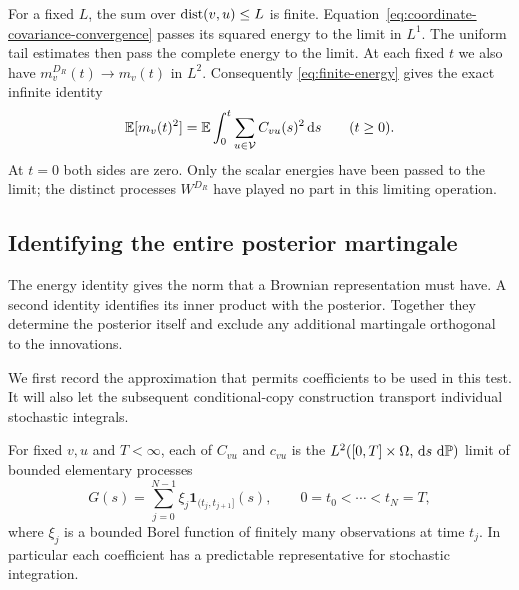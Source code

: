 For a fixed $L$, the sum over $\operatorname{dist}(v,u)\le L$ is finite.
Equation~\eqref{eq:coordinate-covariance-convergence} passes its
squared energy to the limit in $L^1$.  The uniform tail estimates
then pass the complete energy to the limit.  At each fixed $t$ we
also have $m_v^{D_R}(t)\to m_v(t)$ in $L^2$.  Consequently
\eqref{eq:finite-energy} gives the exact infinite identity
\begin{equation}
 \label{eq:covariance-energy}
 \mathbb E[m_v(t)^2]
    =\mathbb E\int_0^t\sum_{u\in\mathcal V}C_{vu}(s)^2\,\mathrm d s
        \qquad(t\ge0).
\end{equation}
At $t=0$ both sides are zero.  Only the scalar energies have been
passed to the limit; the distinct processes $W^{D_R}$ have played
no part in this limiting operation.

\subsection{Identifying the entire posterior martingale}

The energy identity gives the norm that a Brownian representation must
have.  A second identity identifies its inner product with the
posterior.  Together they determine the posterior itself and exclude
any additional martingale orthogonal to the innovations.

We first record the approximation that permits coefficients to be
used in this test.  It will also let the subsequent conditional-copy
construction transport individual stochastic integrals.

\begin{lemma}
 \label{lem:observation-step-approximation}
For fixed $v,u$ and $T<\infty$, each of $C_{vu}$ and $c_{vu}$ is the
$L^2([0,T]\times\Omega,\,\mathrm d s\,\,\mathrm d\mathbb P)$ limit of bounded elementary
processes
\[
 G(s)=\sum_{j=0}^{N-1}\xi_j\mathbf1_{(t_j,t_{j+1}]}(s),
 \qquad 0=t_0<\cdots<t_N=T,
\]
where $\xi_j$ is a bounded Borel function of finitely many
observations at time $t_j$.  In particular each coefficient has a
predictable representative for stochastic integration.
\end{lemma}


